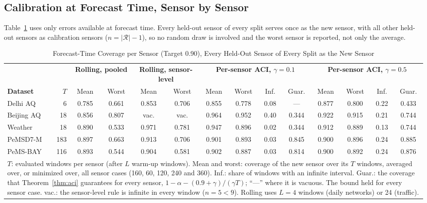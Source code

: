 \documentclass[journal,twoside,web]{ieeecolor}
\begin{document}
\subsection{Calibration at Forecast Time, Sensor by Sensor}
\label{sec:deployable}

Table~\ref{tab:deployable} uses only errors available at forecast time. Every held-out sensor of every split
serves once as the new sensor, with all other held-out sensors as calibration sensors ($n=|\mathcal{R}|-1$), so
no random draw is involved and the worst sensor is reported, not only the average.

\begin{table}[!t]
\caption{Forecast-Time Coverage per Sensor (Target 0.90), Every Held-Out Sensor of Every Split as the New Sensor}
\label{tab:deployable}
\centering
\footnotesize
\setlength{\tabcolsep}{4.2pt}
\begin{tabular}{lrcccccccccccc}
\toprule
 & & \multicolumn{2}{c}{\textbf{Rolling, pooled}} & \multicolumn{2}{c}{\textbf{Rolling, sensor-level}} &
 \multicolumn{4}{c}{\textbf{Per-sensor ACI, $\gamma=0.1$}} & \multicolumn{4}{c}{\textbf{Per-sensor ACI, $\gamma=0.5$}} \\
\textbf{Dataset} & $T$ & Mean & Worst & Mean & Worst & Mean & Worst & Inf. & Guar. & Mean & Worst & Inf. & Guar. \\
\midrule
Delhi AQ   &   6 & 0.785 & 0.661 & 0.853 & 0.706 & 0.855 & 0.778 & 0.08 & ---   & 0.877 & 0.800 & 0.22 & 0.433 \\
Beijing AQ &  18 & 0.856 & 0.807 & vac.  & vac.  & 0.964 & 0.952 & 0.40 & 0.344 & 0.922 & 0.915 & 0.21 & 0.744 \\
Weather    &  18 & 0.890 & 0.533 & 0.971 & 0.781 & 0.947 & 0.896 & 0.02 & 0.344 & 0.912 & 0.889 & 0.13 & 0.744 \\
PeMSD7-M   & 183 & 0.897 & 0.663 & 0.913 & 0.706 & 0.901 & 0.893 & 0.03 & 0.845 & 0.900 & 0.896 & 0.24 & 0.885 \\
PeMS-BAY   & 116 & 0.893 & 0.544 & 0.904 & 0.581 & 0.902 & 0.887 & 0.03 & 0.814 & 0.900 & 0.892 & 0.24 & 0.876 \\
\bottomrule
\multicolumn{14}{p{0.95\textwidth}}{\footnotesize $T$: evaluated windows per sensor (after $L$ warm-up windows).
Mean and worst: coverage of the new sensor over its $T$ windows, averaged over, or minimized over, all
sensor cases (160, 60, 120, 240 and 360). Inf.: share of windows with an infinite interval. Guar.: the coverage
that Theorem~\ref{thm:aci} guarantees for every sensor, $1-\alpha-(0.9+\gamma)/(\gamma T)$; ``---'' where it is
vacuous. The bound held for every sensor case. vac.: the sensor-level rule is infinite in every window ($n=5<9$).
Rolling uses $L=4$ windows (daily networks) or 24 (traffic).} \\
\end{tabular}
\end{table}
\end{document}
